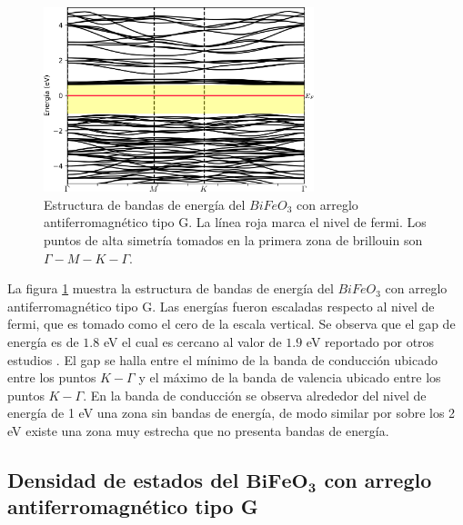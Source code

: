\begin{figure}[H]
    \centering
    
    \includegraphics[width=0.7\textwidth]{contenido/resultados/ferrita_bismuto/img_ferrita_bismuto/BiFeO3_bandas_G_inf.png}
    \singlespace
    \caption[Bandas de energ\'ia del $BiFeO_{3}$ con arreglo 
    antiferromagn\'etico tipo G]{Estructura de bandas de energ\'ia del 
        $BiFeO_{3}$ con arreglo antiferromagn\'etico tipo G. La l\'inea roja 
        marca el 
        nivel de fermi. Los puntos de alta simetr\'ia tomados en la primera 
        zona de 
        brillouin son $\Gamma - M - K - \Gamma$.}
    \label{bfo_band_g}
\end{figure}


La figura \ref{bfo_band_g} muestra la estructura de bandas de energ\'ia del 
$BiFeO_{3}$ con arreglo antiferromagn\'etico tipo G. Las energ\'ias 
fueron escaladas respecto al nivel de fermi, que es tomado como el 
cero de la escala vertical. Se observa que el gap de 
energ\'ia es de $1.8$ eV el cual es cercano al valor de $1.9$ eV reportado por 
otros estudios \cite{ju2009,lee2012}. El gap se halla entre el m\'inimo de la 
banda de conducci\'on ubicado entre los puntos $K - \Gamma$ y el m\'aximo de la 
banda de valencia ubicado entre los puntos $K - \Gamma$. En la banda de 
conducci\'on se observa alrededor del nivel de energ\'ia de 1 eV una zona sin 
bandas de energ\'ia, de modo similar por sobre los 2 eV existe una zona muy 
estrecha que no presenta bandas de energ\'ia.

\subsection{Densidad de estados del $\mathbf{BiFeO_{3}}$ con arreglo      
antiferromagn\'etico tipo G}


